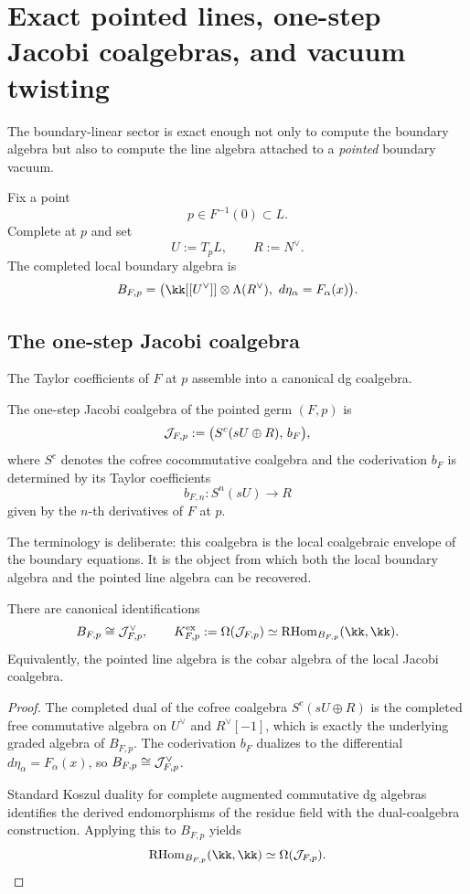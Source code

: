 \section{Exact pointed lines, one-step Jacobi coalgebras, and vacuum twisting}%

The boundary-linear sector is exact enough not only to compute the boundary algebra but also to compute the line algebra attached to a \emph{pointed} boundary vacuum.

Fix a point
\[
p\in F^{-1}(0)\subset L.
\]
Complete at $p$ and set
\[
U:=T_pL,
\qquad
R:=N^\vee.
\]
The completed local boundary algebra is
\[
B_{F,p}
=
\bigl(\kk[[U^\vee]]\ot \Lambda(R^\vee),\ d\eta_\alpha=F_\alpha(x)\bigr).
\]

\subsection{The one-step Jacobi coalgebra}

The Taylor coefficients of $F$ at $p$ assemble into a canonical dg coalgebra.

\begin{definition}
The one-step Jacobi coalgebra of the pointed germ $(F,p)$ is
\[
\mathcal J_{F,p}:=\bigl(S^c(sU\oplus R),\, b_F\bigr),
\]
where $S^c$ denotes the cofree cocommutative coalgebra and the coderivation $b_F$ is determined by its Taylor coefficients
\[
b_{F,n}: S^n(sU)\longrightarrow R
\]
given by the $n$-th derivatives of $F$ at $p$.
\end{definition}

The terminology is deliberate: this coalgebra is the local coalgebraic envelope of the boundary equations. It is the object from which both the local boundary algebra and the pointed line algebra can be recovered.

\begin{theorem}%
There are canonical identifications
\[
B_{F,p}\cong \cJ_{F,p}^\vee,
\qquad
K^{\mathrm{ex}}_{F,p}:=\Cobar(\cJ_{F,p})
\simeq
\RHom_{B_{F,p}}(\kk,\kk).
\]
Equivalently, the pointed line algebra is the cobar algebra of the local Jacobi coalgebra.
\end{theorem}

\begin{proof}
The completed dual of the cofree coalgebra $S^c(sU\oplus R)$ is the completed free commutative algebra on $U^\vee$ and $R^\vee[-1]$, which is exactly the underlying graded algebra of $B_{F,p}$. The coderivation $b_F$ dualizes to the differential $d\eta_\alpha=F_\alpha(x)$, so $B_{F,p}\cong \mathcal J_{F,p}^\vee$.

Standard Koszul duality for complete augmented commutative dg algebras
identifies the derived endomorphisms of the residue field with the
dual-coalgebra construction. Applying this to $B_{F,p}$ yields
\[
\RHom_{B_{F,p}}(\kk,\kk)\simeq \Cobar(\cJ_{F,p}).
\]
\end{proof}

